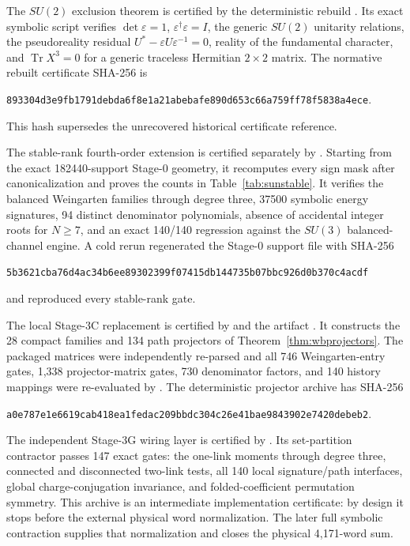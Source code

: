 \documentclass[11pt]{article}
\newcommand{\Tr}{\operatorname{Tr}}
\begin{document}
The $SU(2)$ exclusion theorem is certified by the deterministic rebuild
. Its exact symbolic
script verifies $\det\varepsilon=1$, $\varepsilon^\dagger\varepsilon=I$,
the generic $SU(2)$ unitarity relations, the pseudoreality residual
$U^*-\varepsilon U\varepsilon^{-1}=0$, reality of the fundamental character,
and $\Tr X^3=0$ for a generic traceless Hermitian $2\times2$ matrix. The
normative rebuilt certificate SHA-256 is
\begin{center}
\texttt{893304d3e9fb1791debda6f8e1a21abebafe890d653c66a759ff78f5838a4ece}.
\end{center}
This hash supersedes the unrecovered historical certificate reference.

The stable-rank fourth-order extension is certified separately by
. Starting from the exact 182440-support
Stage-0 geometry, it recomputes every sign mask after canonicalization and
proves the counts in Table~\ref{tab:sunstable}. It verifies the balanced
Weingarten families through degree three, 37500 symbolic energy signatures,
94 distinct denominator polynomials, absence of accidental integer roots for
$N\geq7$, and an exact 140/140 regression against the $SU(3)$ balanced-channel
engine. A cold rerun regenerated the Stage-0 support file with SHA-256
\begin{center}
\texttt{5b3621cba76d4ac34b6ee89302399f07415db144735b07bbc926d0b370c4acdf}
\end{center}
and reproduced every stable-rank gate.

The local Stage-3C replacement is certified by
 and the artifact
. It constructs the
28 compact families and 134 path projectors of
Theorem~\ref{thm:wbprojectors}. The packaged matrices were independently
re-parsed and all 746 Weingarten-entry gates, 1,338 projector-matrix gates,
730 denominator factors, and 140 history mappings were re-evaluated by
. The deterministic projector archive
has SHA-256
\begin{center}
\texttt{a0e787e1e6619cab418ea1fedac209bbdc304c26e41bae9843902e7420debeb2}.
\end{center}
The independent Stage-3G wiring layer is certified by
. Its set-partition contractor passes
147 exact gates: the one-link moments through degree three, connected and
disconnected two-link tests, all 140 local signature/path interfaces, global
charge-conjugation invariance, and folded-coefficient permutation symmetry.
This archive is an intermediate implementation certificate: by design it
stops before the external physical word normalization. The later full
symbolic contraction supplies that normalization and closes the physical
4,171-word sum.
\end{document}
